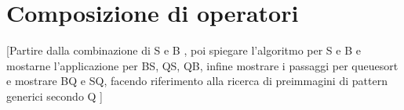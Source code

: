 \chapter{Composizione di operatori}
[Partire dalla combinazione di S e B \cite{albert2010inverse}, poi spiegare l'algoritmo per S e B \cite{claesson2012sorting} e mostarne l'applicazione per BS, QS, QB, infine mostrare i passaggi per queuesort e mostrare BQ e SQ, facendo riferimento alla ricerca di preimmagini di pattern generici secondo Q \cite{magnusson2013sorting}]